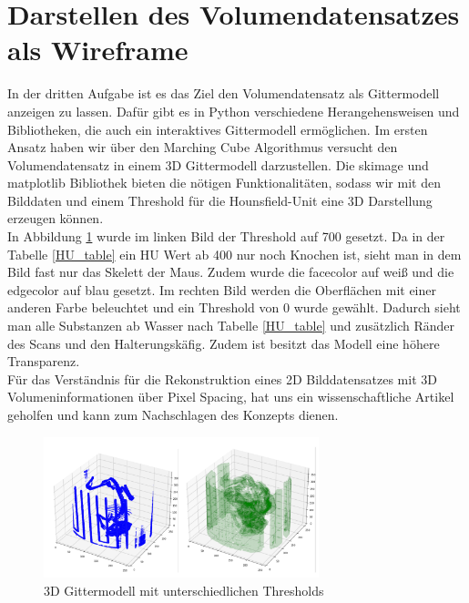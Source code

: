 \documentclass[conference]{IEEEtran}
\begin{document}
\section{Darstellen des Volumendatensatzes als Wireframe}
In der dritten Aufgabe ist es das Ziel den Volumendatensatz als Gittermodell anzeigen zu lassen. Dafür gibt es in Python verschiedene Herangehensweisen und Bibliotheken, die auch ein interaktives Gittermodell ermöglichen.
Im ersten Ansatz haben wir über den Marching Cube Algorithmus\cite{marching_cubes} versucht den Volumendatensatz in einem 3D Gittermodell darzustellen. Die skimage und matplotlib Bibliothek bieten die nötigen Funktionalitäten, sodass wir mit den Bilddaten und einem Threshold für die Hounsfield-Unit eine 3D Darstellung erzeugen können. \\
In Abbildung \ref{wireframes} wurde im linken Bild der Threshold auf 700 gesetzt. Da in der Tabelle \ref{HU_table} ein HU Wert ab 400 nur noch Knochen ist, sieht man in dem Bild fast nur das Skelett der Maus. Zudem wurde die facecolor auf weiß und die edgecolor auf blau gesetzt.
Im rechten Bild werden die Oberflächen mit einer anderen Farbe beleuchtet und ein Threshold von 0 wurde gewählt. Dadurch sieht man alle Substanzen ab Wasser nach Tabelle \ref{HU_table} und zusätzlich Ränder des Scans und den Halterungskäfig. Zudem ist besitzt das Modell eine höhere Transparenz. \\

Für das Verständnis für die Rekonstruktion eines 2D Bilddatensatzes mit 3D Volumeninformationen über Pixel Spacing, hat uns ein wissenschaftliche Artikel\cite{3d_reconstructing_dicom} geholfen und kann zum Nachschlagen des Konzepts dienen.


\begin{figure}[H]
	\begin{center}
		\includegraphics[width=8cm]{latex/images/wireframes.png}
	 	\caption{3D Gittermodell mit unterschiedlichen Thresholds}
	 	\label{wireframes}
	\end{center}
\end{figure}
\end{document}
